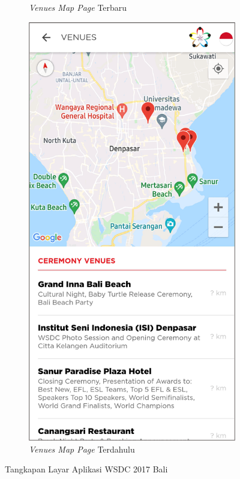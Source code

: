 \begin{figure}[H]
\begin{subfigure}[b]{0.3\textwidth}
         \caption{\textit{Venues Map Page} Terbaru}
         \label{fig:ssVenueMap}
     \end{subfigure}
     \hspace*{0.5in}
     \begin{subfigure}[b]{0.3\textwidth}
         \centering
         \includegraphics[width=\textwidth]{Gambar/VenuesMapPage.png}
         \caption{\textit{Venues Map Page} Terdahulu}
         \label{fig:ssVenueMapOld}
     \end{subfigure}
        \caption{Tangkapan Layar Aplikasi WSDC 2017 Bali}
        \label{fig:ssApk1}
\end{figure}


